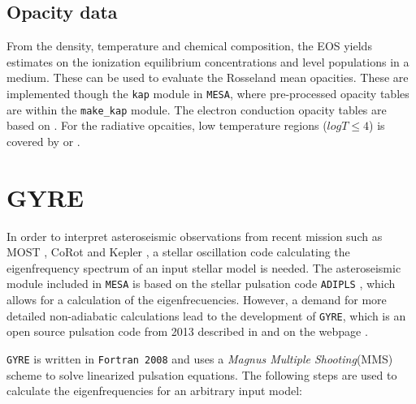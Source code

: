 \subsection{Opacity data}

From the density, temperature and chemical composition, the EOS yields estimates on the ionization equilibrium concentrations and level populations in a medium. These can be used to evaluate the Rosseland mean opacities. These are implemented though the \texttt{kap} module in \texttt{MESA}, where pre-processed opacity tables are within the \texttt{make\_kap} module. The electron conduction opacity
tables are based on \citet{cassisi2007updated}. For the radiative opcaities, low temperature regions ($log T \leqslant 4$) is covered by \citet{freedman2008line} or \citet{ferguson2005low}.


\section{GYRE}
\label{sec:gyre}

In order to interpret asteroseismic observations from recent mission such as MOST \citep{walker2003most,matthews2007one}, CoRot \citep{michel2008first} and Kepler \citep{borucki2009transiting, gilliland2010kepler}, a stellar oscillation code calculating
the eigenfrequency spectrum of an input stellar model is needed. 
The asteroseismic module included in \texttt{MESA} is based on the stellar pulsation code \texttt{ADIPLS} \citep{christensen2008adipls}, which allows for a calculation of the eigenfrecuencies. However, a demand for more detailed non-adiabatic calculations lead to the development of \texttt{GYRE}, which is an open source pulsation code from 2013 described in  \citep{townsend2013, townsend2017} and on the webpage \citep{bitgyre}. 

\texttt{GYRE} is written in \texttt{Fortran 2008} and uses a \textit{Magnus Multiple Shooting}(MMS) scheme to solve linearized pulsation equations. The following steps are used to calculate the eigenfrequencies for an arbitrary input model:


